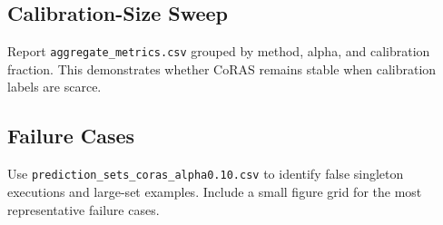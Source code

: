 \subsection{Calibration-Size Sweep}

Report \texttt{aggregate\_metrics.csv} grouped by method, alpha, and calibration fraction. This demonstrates whether CoRAS remains stable when calibration labels are scarce.

\subsection{Failure Cases}

Use \texttt{prediction\_sets\_coras\_alpha0.10.csv} to identify false singleton executions and large-set examples. Include a small figure grid for the most representative failure cases.

